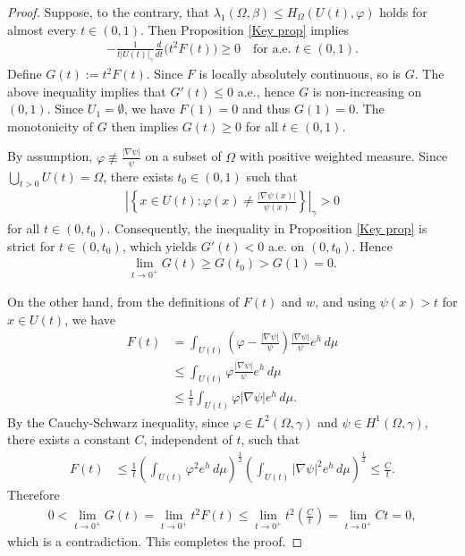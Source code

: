 \documentclass[11pt,leqno]{amsart}
\numberwithin{equation}{section}
\begin{document}
\begin{proof}
Suppose,  to the contrary, that $\lambda_{1}(\Omega,\beta) \leq H_{\Omega}(U(t),\varphi)$ holds for almost every $t\in(0,1)$. Then  Proposition \ref{Key prop} implies
\begin{align*}
-\frac{1}{t|U(t)|_\gamma}\frac{d}{dt}\big(t^{2}F(t)\big) \geq 0 \quad \text{for a.e. } t\in(0,1).
\end{align*}
Define $G(t) := t^2 F(t)$. Since $F$ is locally absolutely continuous, so is $G$. The above inequality implies that $G'(t) \le 0$ a.e., hence $G$ is non-increasing on $(0,1)$. Since $U_1 = \emptyset$, we have $F(1)=0$ and thus $G(1)=0$. The monotonicity of $G$ then implies $G(t) \geq 0$ for all $t\in(0,1)$.

By  assumption, $\varphi \not\equiv \frac{|\nabla\psi|}{\psi}$ on a subset of $\Omega$ with positive weighted measure. Since $\bigcup_{t>0}U(t)=\Omega$, there exists $t_0\in(0,1)$ such that
\begin{align*}
\left|\left\{x\in U(t): \varphi(x)\neq \frac{|\nabla\psi(x)|}{\psi(x)}\right\}\right|_{\gamma} > 0
\end{align*}
for all $t\in(0,t_0)$. Consequently, the inequality in Proposition \ref{Key prop} is strict for $t\in(0,t_0)$, which yields $G'(t) < 0$ a.e. on $(0, t_0)$. Hence 
\begin{align*}
\lim_{t\to 0^+}G(t) \ge G(t_0) > G(1) = 0.
\end{align*}

On the other hand, from the definitions of $F(t)$ and $w$, and using  $\psi(x) > t$ for $x \in U(t)$, we have
\begin{align*}
F(t)
&= \int_{U(t)}\left(\varphi - \frac{|\nabla \psi|}{\psi}\right)\frac{|\nabla \psi|}{\psi}e^{h}\,d\mu \\
&\leq \int_{U(t)}\varphi \frac{|\nabla \psi|}{\psi}e^{h}\,d\mu \\
&\leq \frac{1}{t}\int_{U(t)}\varphi |\nabla \psi|e^{h}\,d\mu.
\end{align*}
By the  Cauchy-Schwarz inequality, since  $\varphi \in L^2(\Omega,\gamma)$ and $\psi \in H^1(\Omega,\gamma)$, there exists a constant $C$, independent of $t$, such that 
\begin{align*}
F(t)
&\leq \frac{1}{t}\left(\int_{U(t)}\varphi^2 e^{h}\,d\mu\right)^{\frac12}\left(\int_{U(t)}|\nabla\psi|^2 e^{h}\,d\mu\right)^{\frac12}
\leq \frac{C}{t}.
\end{align*}
Therefore
\begin{align*}
0 < \lim_{t\to 0^+}G(t) = \lim_{t\to 0^+}t^2 F(t) \leq \lim_{t\to 0^+}t^2 \left(\frac{C}{t}\right) = \lim_{t\to 0^+} Ct = 0,
\end{align*}
which is a contradiction. This completes the proof.
\end{proof}
\end{document}
